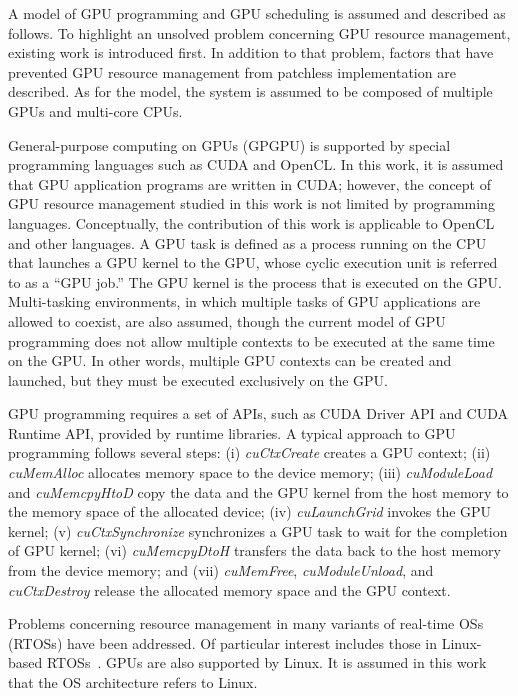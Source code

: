 \label{sec:system_model}
A model of GPU programming and GPU scheduling is assumed and described as follows.
To highlight an unsolved problem concerning GPU resource management, existing work is introduced first.
In addition to that problem, factors that have prevented GPU resource management from patchless implementation are described.
As for the model, the system is assumed to be composed of multiple GPUs and multi-core CPUs.

General-purpose computing on GPUs (GPGPU) is supported by special programming languages such as CUDA and OpenCL.
In this work, it is assumed that GPU application programs are written in CUDA; however, the concept of GPU resource management studied in this work is not limited by programming languages.
Conceptually, the contribution of this work is applicable to OpenCL and other languages.
A GPU task is defined as a process running on the CPU that launches a GPU kernel to the GPU, whose cyclic execution unit is referred to as a ``GPU job.''
The GPU kernel is the process that is executed on the GPU.
Multi-tasking environments, in which multiple tasks of GPU applications are allowed to coexist, are also assumed, though the current model of GPU programming does not allow multiple contexts to be executed at the same time on the GPU.
In other words, multiple GPU contexts can be created and launched, but they must be executed exclusively on the GPU.

GPU programming requires a set of APIs, such as CUDA Driver API and CUDA Runtime API, provided by runtime libraries.
A typical approach to GPU programming follows several steps: (i) \textit{cuCtxCreate} creates a GPU context; (ii) \textit{cuMemAlloc} allocates memory space to the device memory; (iii) \textit{cuModuleLoad} and \textit{cuMemcpyHtoD} copy the data and the GPU kernel from the host memory to the memory space of the allocated device; (iv) \textit{cuLaunchGrid} invokes the GPU kernel; (v) \textit{cuCtxSynchronize} synchronizes a GPU task to wait for the completion of GPU kernel; (vi) \textit{cuMemcpyDtoH} transfers the data back to the host memory from the device memory; and (vii) \textit{cuMemFree}, \textit{cuModuleUnload}, and \textit{cuCtxDestroy} release the allocated memory space and the GPU context.

Problems concerning resource management in many variants of real-time OSs (RTOSs) \cite{spring,redline,itron,rk} have been addressed.
Of particular interest includes those in Linux-based RTOSs~\cite{litmus,prk,rtai,yodaiken1999rtlinux,kato2009loadable}.
GPUs are also supported by Linux.
It is assumed in this work that the OS architecture refers to Linux.

